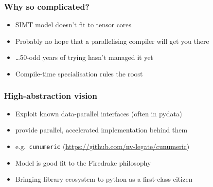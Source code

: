\documentclass[aspectratio=169]{beamer}
\begin{document}
\begin{frame}[fragile]
\end{frame}

\begin{frame}
  \frametitle{Why so complicated?}
  \begin{itemize}
  \item SIMT model doesn't fit to tensor cores
  \item Probably no hope that a parallelising compiler will get you
    there
  \item \dots 50-odd years of trying hasn't managed it yet
  \item Compile-time specialisation rules the roost
  \end{itemize}
\end{frame}

\begin{frame}[fragile]
  \frametitle{High-abstraction vision}
  \begin{itemize}
  \item Exploit known data-parallel interfaces (often in pydata)
  \item provide parallel, accelerated implementation behind them
  \item e.g.~\verb~cunumeric~
    (\url{https://github.com/nv-legate/cunumeric})
  \item Model is good fit to the Firedrake philosophy
  \item Bringing library ecosystem to python as a first-class citizen
  \end{itemize}
\end{frame}
\end{document}
